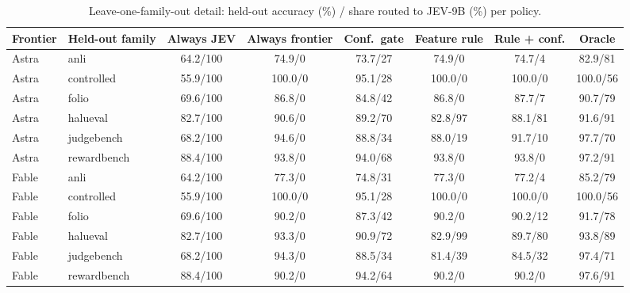 \begin{table}[t]
\centering\small
\caption{Leave-one-family-out detail: held-out accuracy (\%) / share routed to JEV-9B (\%) per policy.}
\label{tab:routingdetail}
\begin{tabular}{@{}llcccccc@{}}
\toprule
Frontier & Held-out family & Always JEV & Always frontier & Conf.\ gate & Feature rule & Rule + conf. & Oracle \\
\midrule
Astra & anli & 64.2/100 & 74.9/0 & 73.7/27 & 74.9/0 & 74.7/4 & 82.9/81 \\
Astra & controlled & 55.9/100 & 100.0/0 & 95.1/28 & 100.0/0 & 100.0/0 & 100.0/56 \\
Astra & folio & 69.6/100 & 86.8/0 & 84.8/42 & 86.8/0 & 87.7/7 & 90.7/79 \\
Astra & halueval & 82.7/100 & 90.6/0 & 89.2/70 & 82.8/97 & 88.1/81 & 91.6/91 \\
Astra & judgebench & 68.2/100 & 94.6/0 & 88.8/34 & 88.0/19 & 91.7/10 & 97.7/70 \\
Astra & rewardbench & 88.4/100 & 93.8/0 & 94.0/68 & 93.8/0 & 93.8/0 & 97.2/91 \\
Fable & anli & 64.2/100 & 77.3/0 & 74.8/31 & 77.3/0 & 77.2/4 & 85.2/79 \\
Fable & controlled & 55.9/100 & 100.0/0 & 95.1/28 & 100.0/0 & 100.0/0 & 100.0/56 \\
Fable & folio & 69.6/100 & 90.2/0 & 87.3/42 & 90.2/0 & 90.2/12 & 91.7/78 \\
Fable & halueval & 82.7/100 & 93.3/0 & 90.9/72 & 82.9/99 & 89.7/80 & 93.8/89 \\
Fable & judgebench & 68.2/100 & 94.3/0 & 88.5/34 & 81.4/39 & 84.5/32 & 97.4/71 \\
Fable & rewardbench & 88.4/100 & 90.2/0 & 94.2/64 & 90.2/0 & 90.2/0 & 97.6/91 \\
\bottomrule
\end{tabular}
\end{table}
